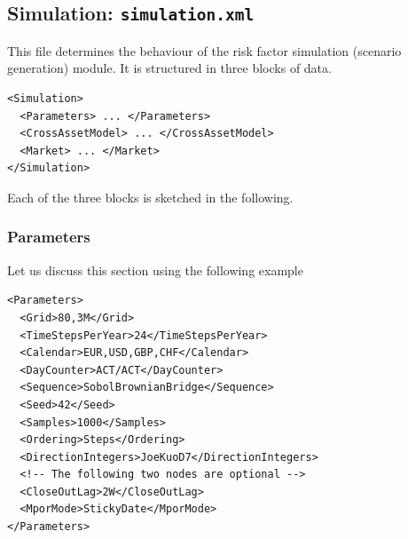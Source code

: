 \subsection{Simulation: {\tt simulation.xml}}\label{sec:simulation}

This file determines the behaviour of the risk factor simulation (scenario generation) module.
It is structured in three blocks of data.

\begin{listing}[H]
\begin{verbatim}
<Simulation>
  <Parameters> ... </Parameters>
  <CrossAssetModel> ... </CrossAssetModel>
  <Market> ... </Market>
</Simulation>
\end{verbatim}
\caption{Simulation configuration}
\label{lst:simulation_configuration}
\end{listing}

Each of the three blocks is sketched in the following.

\subsubsection{Parameters}\label{sec:sim_params}

Let us discuss this section using the following example

\begin{listing}[H]
\begin{verbatim}
<Parameters>
  <Grid>80,3M</Grid>
  <TimeStepsPerYear>24</TimeStepsPerYear>
  <Calendar>EUR,USD,GBP,CHF</Calendar>
  <DayCounter>ACT/ACT</DayCounter>
  <Sequence>SobolBrownianBridge</Sequence>
  <Seed>42</Seed>
  <Samples>1000</Samples>
  <Ordering>Steps</Ordering>
  <DirectionIntegers>JoeKuoD7</DirectionIntegers>
  <!-- The following two nodes are optional -->
  <CloseOutLag>2W</CloseOutLag>
  <MporMode>StickyDate</MporMode>
</Parameters>
\end{verbatim}
\caption{Simulation configuration}
\label{lst:simulation_params_configuration}
\end{listing}

